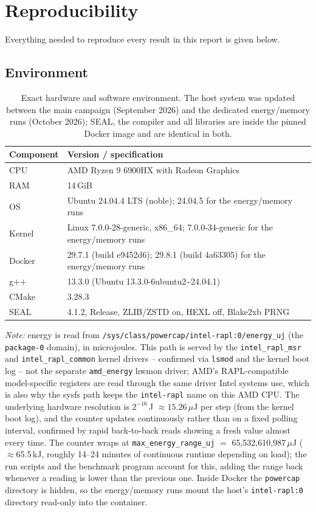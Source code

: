\section{Reproducibility}
\label{sec:reproducibility}

Everything needed to reproduce every result in this report is given below.

\subsection{Environment}

\begin{table}[h!]
\centering\small
\begin{tabular}{@{}ll@{}}
\toprule
\textbf{Component} & \textbf{Version / specification} \\
\midrule
CPU & AMD Ryzen 9 6900HX with Radeon Graphics \\
RAM & 14\,GiB \\
OS & Ubuntu 24.04.4 LTS (noble); 24.04.5 for the energy/memory runs \\
Kernel & Linux 7.0.0-28-generic, x86\_64; 7.0.0-34-generic for the energy/memory runs \\
Docker & 29.7.1 (build e9452d6); 29.8.1 (build 4a63305) for the energy/memory runs \\
g++ & 13.3.0 (Ubuntu 13.3.0-6ubuntu2\textasciitilde24.04.1) \\
CMake & 3.28.3 \\
SEAL & 4.1.2, Release, ZLIB/ZSTD on, HEXL off, Blake2xb PRNG \\
\bottomrule
\end{tabular}
\caption{Exact hardware and software environment. The host system was updated between the main campaign (September 2026) and the dedicated energy/memory runs (October 2026); SEAL, the compiler and all libraries are inside the pinned Docker image and are identical in both.}
\label{tab:env}
\end{table}

\noindent\textit{Note:} energy is read from \texttt{/sys/class/powercap/intel-rapl:0/energy\_uj} (the \texttt{package-0} domain), in microjoules. This path is served by the \texttt{intel\_rapl\_msr} and \texttt{intel\_rapl\_common} kernel drivers -- confirmed via \texttt{lsmod} and the kernel boot log -- not the separate \texttt{amd\_energy} hwmon driver; AMD's RAPL-compatible model-specific registers are read through the same driver Intel systems use, which is also why the sysfs path keeps the \texttt{intel-rapl} name on this AMD CPU. The underlying hardware resolution is $2^{-16}$\,J $\approx 15.26\,\mu$J per step (from the kernel boot log), and the counter updates continuously rather than on a fixed polling interval, confirmed by rapid back-to-back reads showing a fresh value almost every time. The counter wraps at \texttt{max\_energy\_range\_uj} $=$ 65{,}532{,}610{,}987\,$\mu$J ($\approx$65.5\,kJ, roughly 14--24 minutes of continuous runtime depending on load); the run scripts and the benchmark program account for this, adding the range back whenever a reading is lower than the previous one. Inside Docker the \texttt{powercap} directory is hidden, so the energy/memory runs mount the host's \texttt{intel-rapl:0} directory read-only into the container.

